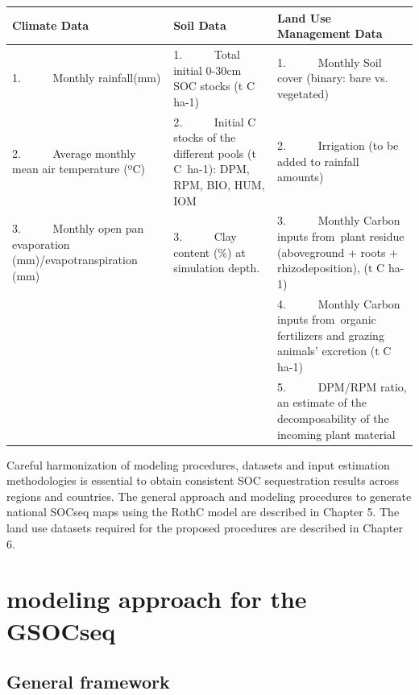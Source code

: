 \documentclass[
  10pt,
  b5paper,
]{book}
\begin{document}
\begin{table}
\centering
\begin{tabular}{l|l|l}
\hline
Climate Data & Soil Data & Land Use  Management Data \\
\hline
1.      Monthly rainfall(mm) & 1.      Total initial 0-30cm SOC stocks (t C ha-1) & 1.      Monthly Soil cover (binary: bare vs. vegetated)\\
\hline
2.      Average monthly mean air temperature (ºC) & 2.      Initial C stocks of the different pools (t C ha-1): DPM, RPM, BIO, HUM, IOM & 2.      Irrigation (to be added to rainfall amounts)\\
\hline
3.      Monthly open pan evaporation (mm)/evapotranspiration (mm) & 3.      Clay content (\%) at simulation depth. & 3.      Monthly Carbon inputs from plant residue (aboveground + roots + rhizodeposition), (t C ha-1)\\
\hline
 &  & 4.      Monthly Carbon inputs from organic fertilizers and grazing animals’ excretion (t C ha-1)\\
\hline
 &  & 5.      DPM/RPM ratio, an estimate of the decomposability of the incoming plant material\\
\hline
\end{tabular}
\end{table}

Careful harmonization of modeling procedures, datasets and input estimation methodologies is essential to obtain consistent SOC sequestration results across regions and countries. The general approach and modeling procedures to generate national SOCseq maps using the RothC model are described in Chapter 5. The land use datasets required for the proposed procedures are described in Chapter 6.

\hypertarget{modeling-approach-for-the-gsocseq}{%
\chapter{\textbar{} modeling approach for the GSOCseq}\label{modeling-approach-for-the-gsocseq}}

\hypertarget{general-framework}{%
\section{General framework}\label{general-framework}}
\end{document}
